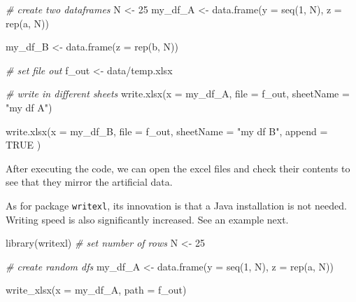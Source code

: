 \documentclass[
  12pt,
]{book}
\newenvironment{Shaded}{\begin{snugshade}}{\end{snugshade}}
\newcommand{\AttributeTok}[1]{\textcolor[rgb]{0.61,0.61,0.61}{#1}}
\newcommand{\CommentTok}[1]{\textcolor[rgb]{0.37,0.37,0.37}{\textit{#1}}}
\newcommand{\ConstantTok}[1]{\textcolor[rgb]{0,0,0}{#1}}
\newcommand{\DecValTok}[1]{\textcolor[rgb]{0.06,0.06,0.06}{#1}}
\newcommand{\FunctionTok}[1]{\textcolor[rgb]{0,0,0}{#1}}
\newcommand{\NormalTok}[1]{#1}
\newcommand{\OtherTok}[1]{\textcolor[rgb]{0.37,0.37,0.37}{#1}}
\newcommand{\StringTok}[1]{\textcolor[rgb]{0.5,0.5,0.5}{#1}}
\begin{document}
\begin{Shaded}
\begin{Highlighting}[]
\CommentTok{\# create two dataframes}
\NormalTok{N }\OtherTok{\textless{}{-}} \DecValTok{25}
\NormalTok{my\_df\_A }\OtherTok{\textless{}{-}} \FunctionTok{data.frame}\NormalTok{(}\AttributeTok{y =} \FunctionTok{seq}\NormalTok{(}\DecValTok{1}\NormalTok{, N), }
                      \AttributeTok{z =} \FunctionTok{rep}\NormalTok{(}\StringTok{\textquotesingle{}a\textquotesingle{}}\NormalTok{, N))}

\NormalTok{my\_df\_B }\OtherTok{\textless{}{-}} \FunctionTok{data.frame}\NormalTok{(}\AttributeTok{z =} \FunctionTok{rep}\NormalTok{(}\StringTok{\textquotesingle{}b\textquotesingle{}}\NormalTok{, N))}

\CommentTok{\# set file out}
\NormalTok{f\_out }\OtherTok{\textless{}{-}} \StringTok{\textquotesingle{}data/temp.xlsx\textquotesingle{}}

\CommentTok{\# write in different sheets}
\FunctionTok{write.xlsx}\NormalTok{(}\AttributeTok{x =}\NormalTok{ my\_df\_A, }
           \AttributeTok{file =}\NormalTok{ f\_out, }
           \AttributeTok{sheetName =} \StringTok{"my df A"}\NormalTok{)}

\FunctionTok{write.xlsx}\NormalTok{(}\AttributeTok{x =}\NormalTok{ my\_df\_B, }
           \AttributeTok{file =}\NormalTok{ f\_out, }
           \AttributeTok{sheetName =} \StringTok{"my df B"}\NormalTok{, }
           \AttributeTok{append =} \ConstantTok{TRUE}\NormalTok{ )}
\end{Highlighting}
\end{Shaded}

After executing the code, we can open the excel files and check their contents to see that they mirror the artificial data.

As for package \texttt{writexl}, its innovation is that a Java installation is not needed. Writing speed is also significantly increased. See an example next. 

\begin{Shaded}
\begin{Highlighting}[]
\FunctionTok{library}\NormalTok{(writexl)}
\CommentTok{\# set number of rows}
\NormalTok{N }\OtherTok{\textless{}{-}} \DecValTok{25}

\CommentTok{\# create random dfs}
\NormalTok{my\_df\_A }\OtherTok{\textless{}{-}} \FunctionTok{data.frame}\NormalTok{(}\AttributeTok{y =} \FunctionTok{seq}\NormalTok{(}\DecValTok{1}\NormalTok{, N),}
                      \AttributeTok{z =} \FunctionTok{rep}\NormalTok{(}\StringTok{\textquotesingle{}a\textquotesingle{}}\NormalTok{, N))}

\FunctionTok{write\_xlsx}\NormalTok{(}\AttributeTok{x =}\NormalTok{ my\_df\_A,}
           \AttributeTok{path =}\NormalTok{ f\_out)}
\end{Highlighting}
\end{Shaded}
\end{document}
